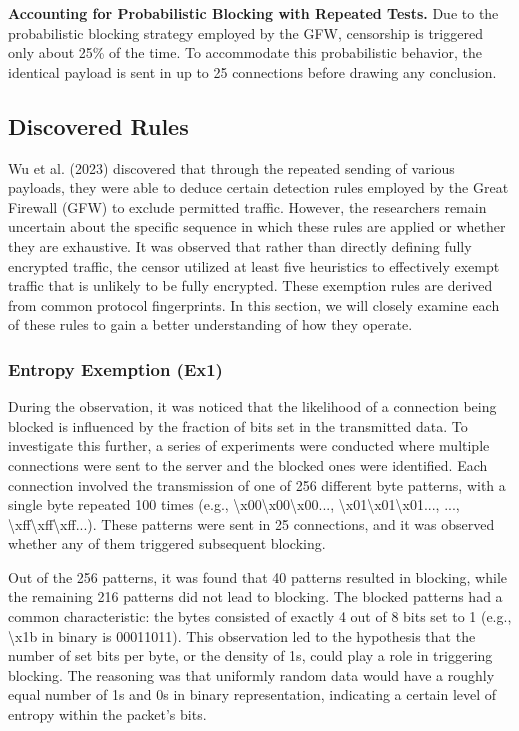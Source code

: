 \textbf{Accounting for Probabilistic Blocking with Repeated Tests.} Due to the probabilistic blocking strategy employed by the GFW, censorship is triggered only about 25\% of the time. To accommodate this probabilistic behavior, the identical payload is sent in up to 25 connections before drawing any conclusion.


\subsection{Discovered Rules}
Wu et al. (2023) discovered that through the repeated sending of various payloads, they were able to deduce certain detection rules employed by the Great Firewall (GFW) to exclude permitted traffic. However, the researchers remain uncertain about the specific sequence in which these rules are applied or whether they are exhaustive. It was observed that rather than directly defining fully encrypted traffic, the censor utilized at least five heuristics to effectively exempt traffic that is unlikely to be fully encrypted. These exemption rules are derived from common protocol fingerprints. In this section, we will closely examine each of these rules to gain a better understanding of how they operate.

\subsubsection{\textbf{Entropy Exemption (Ex1)}}
During the observation, it was noticed that the likelihood of a connection being blocked is influenced by the fraction of bits set in the transmitted data. To investigate this further, a series of experiments were conducted where multiple connections were sent to the server and the blocked ones were identified. Each connection involved the transmission of one of 256 different byte patterns, with a single byte repeated 100 times (e.g., \textbackslash x00\textbackslash x00\textbackslash x00..., \textbackslash x01\textbackslash x01\textbackslash x01..., ..., \textbackslash xff\textbackslash xff\textbackslash xff...). These patterns were sent in 25 connections, and it was observed whether any of them triggered subsequent blocking.

Out of the 256 patterns, it was found that 40 patterns resulted in blocking, while the remaining 216 patterns did not lead to blocking. The blocked patterns had a common characteristic: the bytes consisted of exactly 4 out of 8 bits set to 1 (e.g., \textbackslash x1b in binary is 00011011). This observation led to the hypothesis that the number of set bits per byte, or the density of 1s, could play a role in triggering blocking. The reasoning was that uniformly random data would have a roughly equal number of 1s and 0s in binary representation, indicating a certain level of entropy within the packet's bits.

